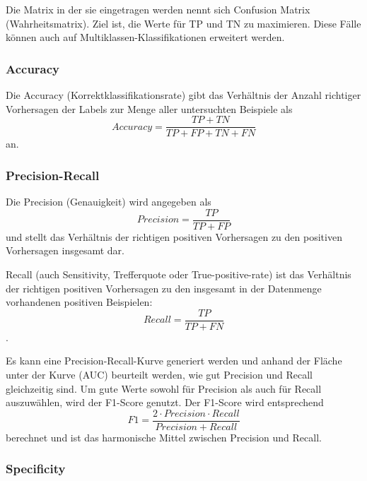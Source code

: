 Die Matrix in der sie eingetragen werden nennt sich Confusion Matrix (Wahrheitsmatrix).
Ziel ist, die Werte für \gls{TP} und \gls{TN} zu maximieren. Diese Fälle können auch auf Multiklassen-Klassifikationen erweitert werden. \cite{nguyen_machine_2018}

\subsubsection*{Accuracy}

Die Accuracy (Korrektklassifikationsrate) gibt das Verhältnis der Anzahl richtiger Vorhersagen der Labels zur Menge aller untersuchten Beispiele als 
\begin{equation}
\label{eq:accuracy}
Accuracy = \frac{TP+TN}{TP+FP+TN+FN}
\end{equation} \cite{nguyen_machine_2018} an. 


\subsubsection*{Precision-Recall}

Die Precision (Genauigkeit) wird angegeben als \begin{equation}
\label{eq:precision}
Precision = \frac{TP}{TP+FP}
\end{equation} und stellt das Verhältnis der richtigen positiven Vorhersagen zu den positiven Vorhersagen insgesamt dar.  



Recall (auch Sensitivity, Trefferquote oder True-positive-rate) ist das Verhältnis der richtigen positiven Vorhersagen zu den insgesamt in der Datenmenge vorhandenen positiven Beispielen:
\begin{equation}
\label{eq:recall}
Recall = \frac{TP}{TP+FN}
\end{equation}.

Es kann eine Precision-Recall-Kurve generiert werden und anhand der Fläche unter der Kurve (\gls{AUC}) beurteilt werden, wie gut Precision und Recall gleichzeitig sind. Um gute Werte sowohl für Precision als auch für Recall auszuwählen, wird der F1-Score genutzt. Der F1-Score wird entsprechend \begin{equation}
\label{eq:F1}
F1 = \frac{2 \cdot Precision \cdot Recall}{Precision + Recall}
\end{equation} berechnet und ist das harmonische Mittel zwischen Precision und Recall. \cite{nguyen_machine_2018}


\subsubsection*{Specificity}

